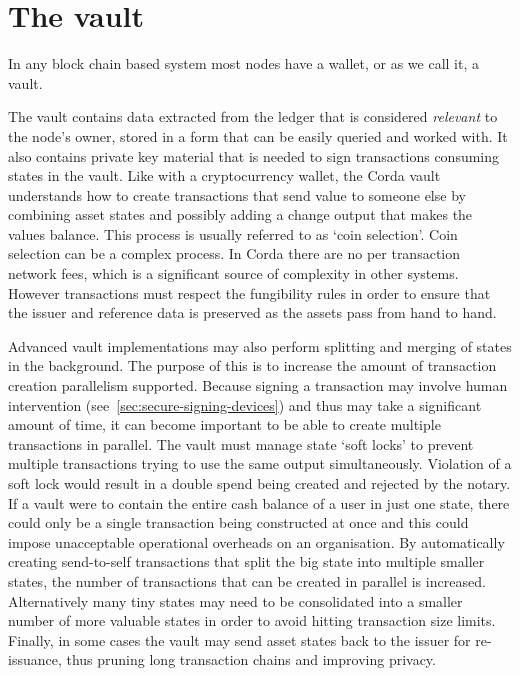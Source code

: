 \documentclass{article}
\begin{document}
\section{The vault}\label{sec:vault}

In any block chain based system most nodes have a wallet, or as we call it, a vault.

The vault contains data extracted from the ledger that is considered \emph{relevant} to the node's owner, stored in
a form that can be easily queried and worked with. It also contains private key material that is needed to sign
transactions consuming states in the vault. Like with a cryptocurrency wallet, the Corda vault understands how to
create transactions that send value to someone else by combining asset states and possibly adding a change output
that makes the values balance. This process is usually referred to as `coin selection'. Coin selection can be a
complex process. In Corda there are no per transaction network fees, which is a significant source of complexity in
other systems. However transactions must respect the fungibility rules in order to ensure that the issuer and
reference data is preserved as the assets pass from hand to hand.

Advanced vault implementations may also perform splitting and merging of states in the background. The purpose of
this is to increase the amount of transaction creation parallelism supported. Because signing a transaction may
involve human intervention (see~\cref{sec:secure-signing-devices}) and thus may take a significant amount of time,
it can become important to be able to create multiple transactions in parallel. The vault must manage state `soft
locks' to prevent multiple transactions trying to use the same output simultaneously. Violation of a soft lock
would result in a double spend being created and rejected by the notary. If a vault were to contain the entire cash
balance of a user in just one state, there could only be a single transaction being constructed at once and this
could impose unacceptable operational overheads on an organisation. By automatically creating send-to-self
transactions that split the big state into multiple smaller states, the number of transactions that can be created
in parallel is increased. Alternatively many tiny states may need to be consolidated into a smaller number of more
valuable states in order to avoid hitting transaction size limits. Finally, in some cases the vault may send asset
states back to the issuer for re-issuance, thus pruning long transaction chains and improving privacy.
\end{document}

